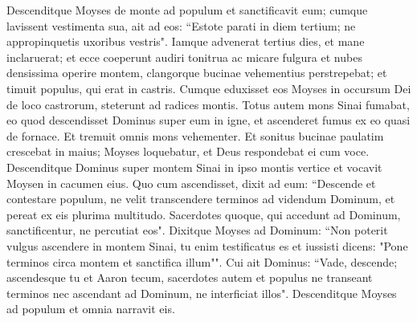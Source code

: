 \begin{biblechapter}
\verse Descenditque Moyses de monte ad populum et sanctificavit eum; cumque lavissent vestimenta sua, 
\verse ait ad eos: “Estote parati in diem tertium; ne appropinquetis uxoribus vestris". 
\verse Iamque advenerat tertius dies, et mane inclaruerat; et ecce coeperunt audiri tonitrua ac micare fulgura et nubes densissima operire montem, clangorque bucinae vehementius perstrepebat; et timuit populus, qui erat in castris. 
\verse Cumque eduxisset eos Moyses in occursum Dei de loco castrorum, steterunt ad radices montis. 
\verse Totus autem mons Sinai fumabat, eo quod descendisset Dominus super eum in igne, et ascenderet fumus ex eo quasi de fornace. Et tremuit omnis mons vehementer. 
\verse Et sonitus bucinae paulatim crescebat in maius; Moyses loquebatur, et Deus respondebat ei cum voce. 
\verse Descenditque Dominus super montem Sinai in ipso montis vertice et vocavit Moysen in cacumen eius. Quo cum ascendisset, 
\verse dixit ad eum: “Descende et contestare populum, ne velit transcendere terminos ad videndum Dominum, et pereat ex eis plurima multitudo. 
\verse Sacerdotes quoque, qui accedunt ad Dominum, sanctificentur, ne percutiat eos". 
\verse Dixitque Moyses ad Dominum: “Non poterit vulgus ascendere in montem Sinai, tu enim testificatus es et iussisti dicens: "Pone terminos circa montem et sanctifica illum"". 
\verse Cui ait Dominus: “Vade, descende; ascendesque tu et Aaron tecum, sacerdotes autem et populus ne transeant terminos nec ascendant ad Dominum, ne interficiat illos". 
\verse Descenditque Moyses ad populum et omnia narravit eis. 
\end{biblechapter}


